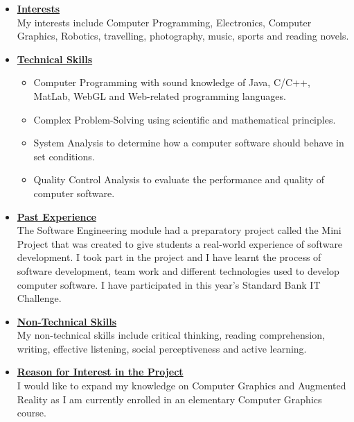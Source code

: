 \documentclass[a4paper,12pt]{article}
\begin{document}
\begin{itemize}
\item {\large \underline{\textbf{Interests}}}\\[0.2cm]
My interests include Computer Programming, Electronics, Computer Graphics, Robotics, travelling, photography, music, sports and reading novels.
\\
\item {\large \underline{\textbf{Technical Skills}}}

	\begin{itemize}
		\item Computer Programming with sound knowledge of Java, C/C++, MatLab, WebGL and Web-related 					programming languages.
		\item Complex Problem-Solving using scientific and mathematical principles.
		\item System Analysis to determine how a computer software should behave in set conditions.
		\item Quality Control Analysis to evaluate the performance and quality of computer software.
	\end{itemize}
\bigskip
\item {\large \underline{\textbf{Past Experience}}}\\[0.2cm]
The Software Engineering module had a preparatory project called the Mini Project that was created to give students a real-world experience of software development. I took part in the project and I have learnt the process of software development, team work and different technologies used to develop computer software. I have participated in this year's Standard Bank IT Challenge. 
\\
\item {\large \underline{\textbf{Non-Technical Skills}}}\\[0.2cm]
My non-technical skills include critical thinking, reading comprehension, writing, effective listening, social perceptiveness and active learning. 
\\
\item {\large \underline{\textbf{Reason for Interest in the Project}}}\\[0.2cm]
I would like to expand my knowledge on Computer Graphics and Augmented Reality as I am currently enrolled in an elementary Computer Graphics course.

\end{itemize}

\newpage
\end{document}
